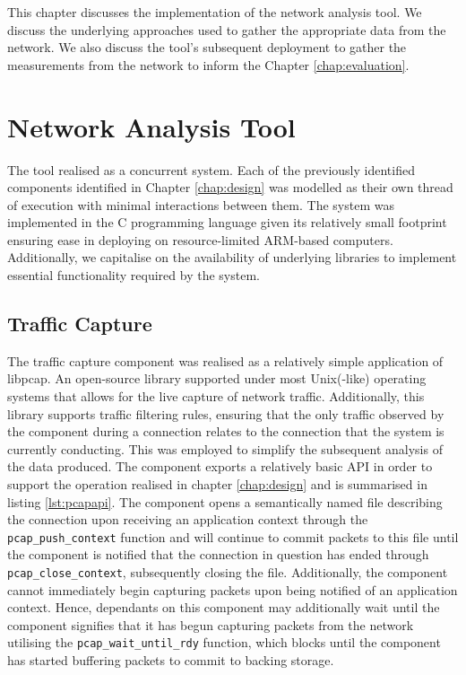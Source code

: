 \documentclass{l4proj}
\begin{document}

This chapter discusses the implementation of the network analysis tool. We discuss the underlying approaches used to gather the appropriate data from the network. We also discuss the tool's subsequent deployment to gather the measurements from the network to inform the Chapter \ref{chap:evaluation}.

\section{Network Analysis Tool}

The tool realised as a concurrent system. Each of the previously identified components identified in Chapter \ref{chap:design} was modelled as their own thread of execution with minimal interactions between them. The system was implemented in the C programming language given its relatively small footprint ensuring ease in deploying on resource-limited ARM-based computers. Additionally, we capitalise on the availability of underlying libraries to implement essential functionality required by the system.

\subsection{Traffic Capture}

The traffic capture component was realised as a relatively simple application of libpcap. An open-source library supported under most Unix(-like) operating systems that allows for the live capture of network traffic. Additionally, this library supports traffic filtering rules, ensuring that the only traffic observed by the component during a connection relates to the connection that the system is currently conducting. This was employed to simplify the subsequent analysis of the data produced. The component exports a relatively basic API in order to support the operation realised in chapter \ref{chap:design} and is summarised in listing \ref{lst:pcapapi}. The component opens a semantically named file describing the connection upon receiving an application context through the \lstinline{pcap_push_context} function and will continue to commit packets to this file until the component is notified that the connection in question has ended through \lstinline{pcap_close_context}, subsequently closing the file. Additionally, the component cannot immediately begin capturing packets upon being notified of an application context. Hence, dependants on this component may additionally wait until the component signifies that it has begun capturing packets from the network utilising the \lstinline{pcap_wait_until_rdy} function, which blocks until the component has started buffering packets to commit to backing storage.
\end{document}

